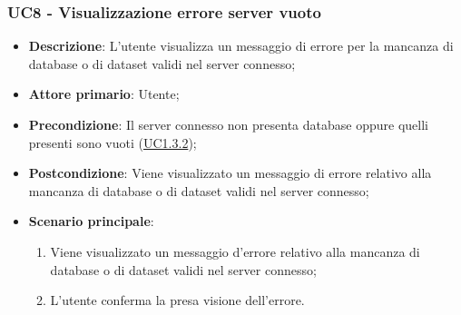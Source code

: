 \subsubsection{UC8 - Visualizzazione errore server vuoto}
\label{sub:uc8}
\begin{itemize}
    \item \textbf{Descrizione}: L'utente visualizza un messaggio di errore per la mancanza di database o di dataset 
    validi nel server connesso;

    \item \textbf{Attore primario}: Utente;
    
    \item \textbf{Precondizione}:   Il server connesso non presenta database oppure quelli presenti sono vuoti 
    (\hyperref[par:uc1.3.2]{UC1.3.2});

    \item \textbf{Postcondizione}:   Viene visualizzato un messaggio di errore relativo alla mancanza di database o di 
    dataset validi nel server connesso;

    \item \textbf{Scenario principale}:
    \begin{enumerate}
        \item Viene visualizzato un messaggio d'errore relativo alla mancanza di database o di dataset validi nel 
        server connesso;
        \item L'utente conferma la presa visione dell'errore.
    \end{enumerate}

\end{itemize}


